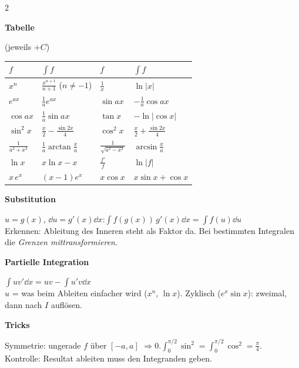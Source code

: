 \documentclass[10pt]{extarticle}
\newcommand{\hd}[1]{\par\medskip{\color{eth}\bfseries\large #1}\par\smallskip}
\newcommand{\sh}[1]{\par\smallskip\textbf{#1}\par}
\begin{document}
\begin{multicols}{2}
\hd{3 \ Integrieren}
\sh{Tabelle} (jeweils $+C$)\\
\begin{tabular}{@{}ll|ll@{}}
$f$ & $\int f$ & $f$ & $\int f$\\\hline
$x^n$ & $\frac{x^{n+1}}{n+1}$ \tiny($n\ne-1$) & $\frac1x$ & $\ln|x|$\\
$e^{ax}$ & $\frac1ae^{ax}$ & $\sin ax$ & $-\frac1a\cos ax$\\
$\cos ax$ & $\frac1a\sin ax$ & $\tan x$ & $-\ln|\cos x|$\\
$\sin^2x$ & $\frac x2-\frac{\sin2x}4$ & $\cos^2x$ & $\frac x2+\frac{\sin2x}4$\\
$\frac1{a^2+x^2}$ & $\frac1a\arctan\frac xa$ & $\frac1{\sqrt{a^2-x^2}}$ & $\arcsin\frac xa$\\
$\ln x$ & $x\ln x-x$ & $\frac{f'}{f}$ & $\ln|f|$\\
$x\,e^x$ & $(x-1)e^x$ & $x\cos x$ & $x\sin x+\cos x$
\end{tabular}
\sh{Substitution} $u=g(x)$, $\dd u=g'(x)\dd x$:\quad $\int f(g(x))\,g'(x)\dd x=\int f(u)\dd u$\\
Erkennen: Ableitung des Inneren steht als Faktor da. Bei bestimmten Integralen die \emph{Grenzen mittransformieren}.
\sh{Partielle Integration} $\int uv'\dd x=uv-\int u'v\dd x$\\
$u$ = was beim Ableiten einfacher wird ($x^n$, $\ln x$). Zyklisch ($e^x\sin x$): zweimal, dann nach $I$ auflösen.
\sh{Tricks}
Symmetrie: ungerade $f$ über $[-a,a]$ $\Rightarrow0$.\quad $\int_0^{\pi/2}\sin^2=\int_0^{\pi/2}\cos^2=\frac\pi4$.\\
Kontrolle: Resultat ableiten muss den Integranden geben.



\end{multicols}
\end{document}
